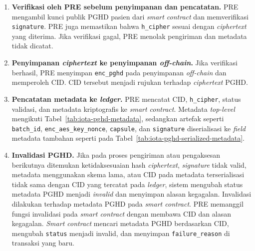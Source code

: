 \begin{enumerate}
    \item \textbf{Verifikasi oleh PRE sebelum penyimpanan dan pencatatan.}
    PRE mengambil kunci publik PGHD pasien dari \textit{smart contract} dan memverifikasi \texttt{signature}. 
    PRE juga memastikan bahwa \texttt{h\_cipher} sesuai dengan \textit{ciphertext} yang diterima. 
    Jika verifikasi gagal, PRE menolak pengiriman dan metadata tidak dicatat.

    \item \textbf{Penyimpanan \textit{ciphertext} ke penyimpanan \textit{off-chain}.}
    Jika verifikasi berhasil, PRE menyimpan \texttt{enc\_pghd} pada penyimpanan \textit{off-chain} dan memperoleh CID\@. 
    CID tersebut menjadi rujukan terhadap \textit{ciphertext} PGHD\@.

    \item \textbf{Pencatatan metadata ke \textit{ledger}.}
    PRE mencatat CID, \texttt{h\_cipher}, status validasi, dan metadata kriptografis ke \textit{smart contract}. Metadata \textit{top-level} mengikuti Tabel~\ref{tab:iota-pghd-metadata}, sedangkan artefak seperti \texttt{batch\_id}, \texttt{enc\_aes\_key\_nonce}, \texttt{capsule}, dan \texttt{signature} diserialisasi ke \textit{field} metadata tambahan seperti pada Tabel~\ref{tab:iota-pghd-serialized-metadata}.

    \item \textbf{Invalidasi PGHD\@.}
    Jika pada proses pengiriman atau pengaksesan berikutnya ditemukan ketidaksesuaian hash \textit{ciphertext}, \textit{signature} tidak valid, metadata menggunakan skema lama, atau CID pada metadata terserialisasi tidak sama dengan CID yang tercatat pada \textit{ledger}, sistem mengubah status metadata PGHD menjadi \textit{invalid} dan menyimpan alasan kegagalan. 
    Invalidasi dilakukan terhadap metadata PGHD pada \textit{smart contract}. 
    PRE memanggil fungsi invalidasi pada \textit{smart contract} dengan membawa CID dan alasan kegagalan. 
    \textit{Smart contract} mencari metadata PGHD berdasarkan CID, mengubah \texttt{status} menjadi invalid, dan menyimpan \texttt{failure\_reason} di transaksi yang baru.



\end{enumerate}
